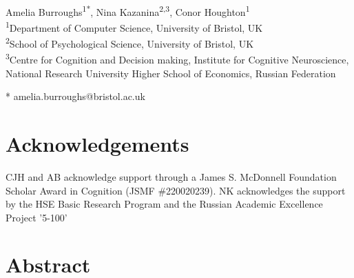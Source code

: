 \documentclass[10pt,letterpaper]{article}
\date{}
\begin{document}
\vspace*{0.2in}

\begin{flushleft}
{\Large
\textbf{} 
}
\newline
\\
Amelia Burroughs\textsuperscript{1*},
Nina Kazanina\textsuperscript{2,3},
Conor Houghton\textsuperscript{1}
\\
\bigskip
\textsuperscript{1}Department of Computer Science, University of Bristol, UK\\
\textsuperscript{2}School of Psychological Science, University of Bristol, UK\\
\textsuperscript{3}Centre for Cognition and Decision making, Institute for Cognitive Neuroscience, National Research University Higher School of Economics, Russian Federation
\\
\bigskip

* amelia.burroughs@bristol.ac.uk

\end{flushleft}


\section*{Acknowledgements}
CJH and AB acknowledge support through a James S. McDonnell Foundation Scholar Award in Cognition (JSMF \#220020239). NK acknowledges the support by the HSE Basic Research Program and the Russian Academic Excellence Project '5-100' 



\section*{Abstract}
\end{document}
